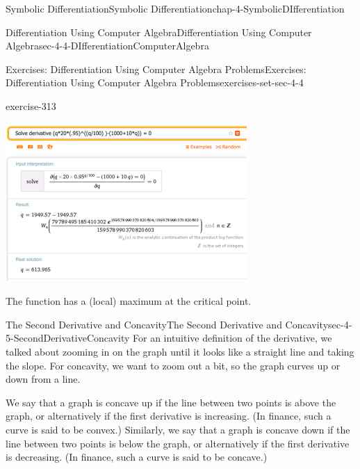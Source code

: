 \documentclass[oneside,10pt,]{book}
\numberwithin{equation}{section}
\begin{document}
\begin{chapterptx}{Symbolic Differentiation}{}{Symbolic Differentiation}{}{}{chap-4-SymbolicDIfferentiation}
\begin{sectionptx}{Differentiation Using Computer Algebra}{}{Differentiation Using Computer Algebra}{}{}{sec-4-4-DIfferentiationComputerAlgebra}
\begin{exercises-subsection-numberless}{Exercises: Differentiation Using Computer Algebra Problems}{}{Exercises: Differentiation Using Computer Algebra Problems}{}{}{exercises-set-sec-4-4}
\begin{divisionexercise}{25}{}{}{exercise-313}
\begin{sidebyside}{1}{0.2}{0.2}{0}
\begin{sbspanel}{0.6}
\includegraphics[width=1\linewidth]{images/sec4-4-sol25b.png}
\end{sbspanel}%
\end{sidebyside}%
\par
\hypertarget{p-1785}{}%
The function has a (local) maximum at the critical point.%
\end{divisionexercise}%
\end{exercises-subsection-numberless}
\end{sectionptx}
%
%
\typeout{************************************************}
\typeout{************************************************}
%
\begin{sectionptx}{The Second Derivative and Concavity}{}{The Second Derivative and Concavity}{}{}{sec-4-5-SecondDerivativeConcavity}
\hypertarget{p-1786}{}%
For an intuitive definition of the derivative, we talked about zooming in on the graph until it looks like a straight line and taking the slope.  For concavity, we want to zoom out a bit, so the graph curves up or down from a line.%
\par
\hypertarget{p-1787}{}%
We say that a graph is concave up if the line between two points is above the graph, or alternatively if the first derivative is increasing.  (In finance, such a curve is said to be convex.)  Similarly, we say that a graph is concave down if the line between two points is below the graph, or alternatively if the first derivative is decreasing.  (In finance, such a curve is said to be concave.)%
\begin{sidebyside}{1}{0.3}{0.3}{0}%
\begin{sbspanel}{0.4}%

\end{sbspanel}
\end{sidebyside}
\end{sectionptx}
\end{chapterptx}
\end{document}

